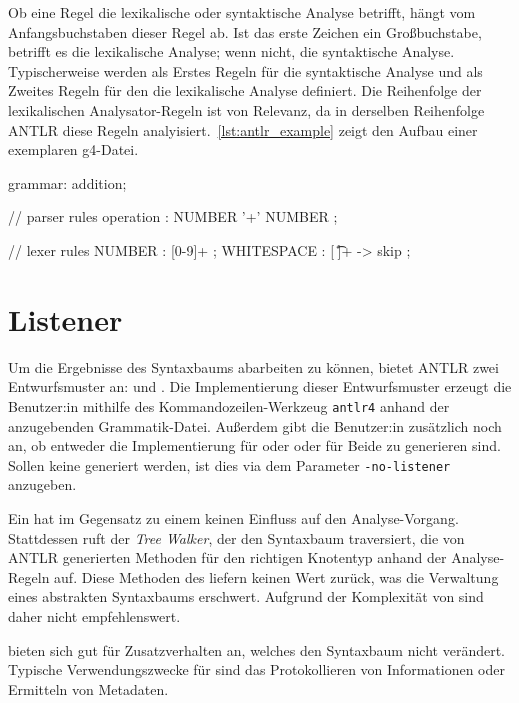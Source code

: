 Ob eine Regel die lexikalische oder syntaktische Analyse betrifft, hängt vom Anfangsbuchstaben dieser Regel ab. Ist das erste Zeichen ein Großbuchstabe, betrifft es die lexikalische Analyse; wenn nicht, die syntaktische Analyse. Typischerweise werden als Erstes Regeln für die syntaktische Analyse und als Zweites Regeln für den die lexikalische Analyse definiert. Die Reihenfolge der lexikalischen Analysator-Regeln ist von Relevanz, da in derselben Reihenfolge ANTLR diese Regeln analyisiert.~\autoref{lst:antlr_example} zeigt den Aufbau einer exemplaren g4-Datei.

\begin{AntlrCode}[numbers=none, caption={Beispielhafter Aufbau einer Grammatik-Definition für Additionen}, label=lst:antlr_example]
grammar: addition;

// parser rules
operation  : NUMBER '+' NUMBER ;

// lexer rules
NUMBER     : [0-9]+ ;
WHITESPACE : [ \t\n\r]+ -> skip ;
\end{AntlrCode}

\section{Listener}

Um die Ergebnisse des Syntaxbaums abarbeiten zu können, bietet ANTLR zwei Entwurfsmuster an: \visitor und \listener. Die Implementierung dieser Entwurfsmuster erzeugt die Benutzer:in mithilfe des Kommandozeilen-Werkzeug \texttt{antlr4} anhand der anzugebenden Grammatik-Datei. Außerdem gibt die Benutzer:in zusätzlich noch an, ob entweder die Implementierung für \visitor oder \listener oder für Beide zu generieren sind. Sollen keine \listener generiert werden, ist dies via dem Parameter \texttt{-no-listener} anzugeben.

Ein \listener hat im Gegensatz zu einem \visitor keinen Einfluss auf den Analyse-Vorgang. Stattdessen ruft der \textit{Tree Walker}, der den Syntaxbaum traversiert, die von ANTLR generierten Methoden für den richtigen Knotentyp anhand der Analyse-Regeln auf. Diese Methoden des \listeners liefern keinen Wert zurück, was die Verwaltung eines abstrakten Syntaxbaums erschwert. Aufgrund der Komplexität von \toya sind \listener daher nicht empfehlenswert.

\listener bieten sich gut für Zusatzverhalten an, welches den Syntaxbaum nicht verändert. Typische Verwendungszwecke für \listener sind das Protokollieren von Informationen oder Ermitteln von Metadaten.

